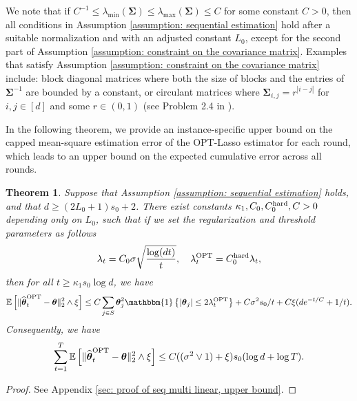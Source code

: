 \documentclass[aos,preprint]{imsart}
\theoremstyle{plain}
\newtheorem{theorem}{Theorem}
\theoremstyle{definition}
\newcommand{\btheta}{\boldsymbol{\theta}}
\newcommand{\idf}{\mathbbm{1}}
\newcommand{\bSigma}{\boldsymbol{\Sigma}}
\newcommand{\lmin}[1]{\lambda_{\min}\left(#1\right)}
\newcommand{\lmax}[1]{\lambda_{\max}\left(#1\right)}
\newcommand{\ptheta}{\widehat{\boldsymbol{\theta}}^{\textup{OPT}}}
\newcommand{\hdlambda}{\lambda^{\textup{OPT}}}
\newcommand{\Exp}{\mathbb{E}}
\begin{document}
We note that if $C^{-1} \le \lmin{\bSigma} \le \lmax{\bSigma} \le C$ for some constant $C > 0$, then all conditions in Assumption \ref{assumption: sequential estimation} hold after a suitable normalization and with an adjusted constant $L_0$, except for the second part of Assumption \ref{assumption: constraint on the covariance matrix}. Examples that satisfy Assumption \ref{assumption: constraint on the covariance matrix} include: block diagonal matrices where both the size of blocks and the entries of $\bSigma^{-1}$ are bounded by a constant, or circulant matrices where $\bSigma_{i,j} = r^{|i-j|}$ for $i,j \in [d]$ and some $r\in (0,1)$ (see Problem 2.4 in \cite{buhlmann2011statistics}).

In the following theorem, we provide an instance-specific upper bound on the capped mean-square estimation error of the OPT-Lasso estimator for each round, which leads to an upper bound on the expected cumulative error across all rounds.

\begin{theorem}\label{thm: seq multi linear, upper bound}
Suppose that Assumption \ref{assumption: sequential estimation} holds, and that $d \ge (2L_0+1)s_0 + 2$. There exist constants $\kappa_1, C_0, C_0^{\textup{hard}},C>0$ depending only on $L_0$,  such that if we set the regularization and threshold parameters as follows
\begin{equation}\label{eq: online regularization threshold parameter}
    \lambda_t = C_0\sigma\sqrt{\frac{\log (dt)}{t}},\quad \hdlambda_t =  C_0^{\textup{hard}}\lambda_t,
\end{equation} 
then for all $t\ge \kappa_1 s_0\log d$, we have 
\begin{equation}\label{eq: opt_lasso_t}
    \Exp\left[\|\ptheta_t-\btheta \|_2^2 \wedge \xi\right] \le C\sum_{j\in S} \btheta_j^2 \idf\left\{|\btheta_j| \le 2\hdlambda_t \right\} 
    + C\sigma^2 s_0/t + C \xi (de^{-t/C}+1/t).
\end{equation}
Consequently, we have
$$
\sum_{t=1}^T \Exp\left[\|\ptheta_t-\btheta \|_2^2 \wedge \xi\right] \le C((\sigma^2 \vee 1) +\xi) s_0(\log d + \log T).
$$
\end{theorem}
\begin{proof} See Appendix \ref{sec: proof of seq multi linear, upper bound}.
\end{proof}
\end{document}
